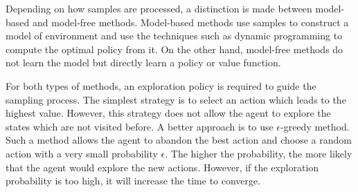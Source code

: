 Depending on how samples are processed, a distinction is made between model-based
and model-free methods. Model-based methods use samples to construct 
a model of environment and use the techniques such as dynamic programming
to compute the optimal policy from it.
On the other hand, model-free methods do not learn the model but directly learn
a policy or value function.

For both types of methods, an exploration policy is required to 
guide the sampling process.
The simplest strategy is to select an action which leads to the highest value. However, 
this strategy does not allow the agent to explore the states which are not visited before.
A better approach is to use $\epsilon$-greedy method. Such a method allows the agent to abandon the
best action and choose a random action with a very small probability $\epsilon$. The higher the probability, the more
likely that the agent would explore the new actions. However, if the exploration probability 
is too high, it will increase the time to converge.





